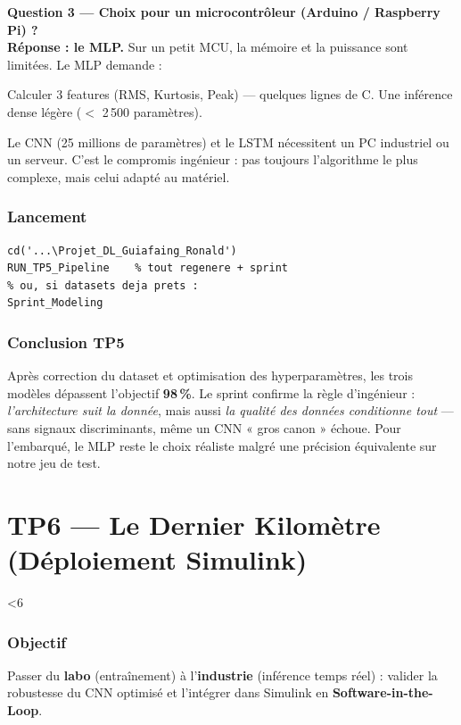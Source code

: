 ﻿\documentclass[11pt,a4paper]{article}
\newcommand{\setfigw}[1]{%
  \ifnum#1<6
    \def\figw{1.0\linewidth}%
  \else
    \def\figw{0.8\linewidth}%
  \fi
}
\begin{document}
\textbf{Question 3 — Choix pour un microcontrôleur (Arduino / Raspberry Pi) ?}\\
\textbf{Réponse : le MLP.} Sur un petit MCU, la mémoire et la puissance sont limitées. Le MLP demande :
\begin{enumerate}
  Calculer 3 features (RMS, Kurtosis, Peak) — quelques lignes de C.
   Une inférence dense légère ($<$ 2\,500 paramètres).
\end{enumerate}
Le CNN (25 millions de paramètres) et le LSTM nécessitent un PC industriel ou un serveur. C'est le compromis ingénieur : pas toujours l'algorithme le plus complexe, mais celui adapté au matériel.

\section{Lancement}
\begin{lstlisting}
cd('...\Projet_DL_Guiafaing_Ronald')
RUN_TP5_Pipeline    % tout regenere + sprint
% ou, si datasets deja prets :
Sprint_Modeling
\end{lstlisting}

\section{Conclusion TP5}
Après correction du dataset et optimisation des hyperparamètres, les trois modèles dépassent l'objectif \textbf{98\,\%}. Le sprint confirme la règle d'ingénieur : \emph{l'architecture suit la donnée}, mais aussi \emph{la qualité des données conditionne tout} — sans signaux discriminants, même un CNN « gros canon » échoue. Pour l'embarqué, le MLP reste le choix réaliste malgré une précision équivalente sur notre jeu de test.

\part{TP6 — Le Dernier Kilomètre (Déploiement Simulink)}
\setfigw{7}

\section{Objectif}
Passer du \textbf{labo} (entraînement) à l'\textbf{industrie} (inférence temps réel) : valider la robustesse du CNN optimisé et l'intégrer dans Simulink en \textbf{Software-in-the-Loop}.
\end{document}
